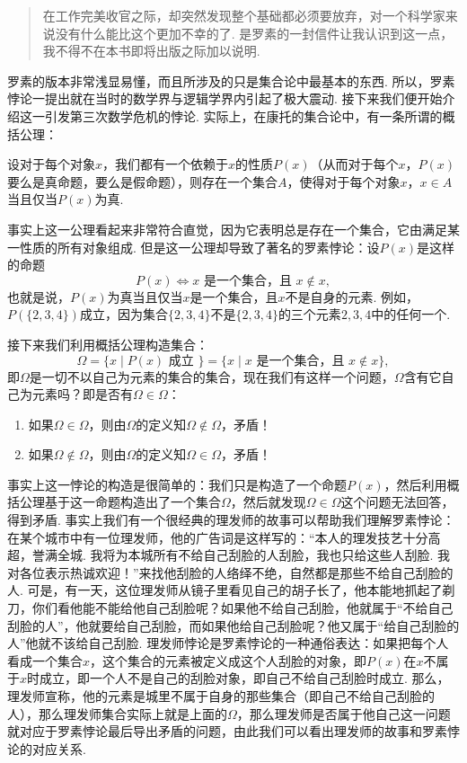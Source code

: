 \begin{quote}
    \kaishu
    在工作完美收官之际，却突然发现整个基础都必须要放弃，对一个科学家来说没有什么能比这个更加不幸的了. 是罗素的一封信件让我认识到这一点，我不得不在本书即将出版之际加以说明.
\end{quote}

罗素的版本非常浅显易懂，而且所涉及的只是集合论中最基本的东西. 所以，罗素悖论一提出就在当时的数学界与逻辑学界内引起了极大震动. 接下来我们便开始介绍这一引发第三次数学危机的悖论. 实际上，在康托的集合论中，有一条所谓的概括公理：

\begin{axiom}%
    设对于每个对象$x$，我们都有一个依赖于$x$的性质$P(x)$（从而对于每个$x$，$P(x)$要么是真命题，要么是假命题），则存在一个集合$A$，使得对于每个对象$x$，$x\in A$当且仅当$P(x)$为真.
\end{axiom}

事实上这一公理看起来非常符合直觉，因为它表明总是存在一个集合，它由满足某一性质的所有对象组成. 但是这一公理却导致了著名的罗素悖论：设$P(x)$是这样的命题
\[P(x)\iff x\text{~是一个集合，且~}x\notin x,\]
也就是说，$P(x)$为真当且仅当$x$是一个集合，且$x$不是自身的元素. 例如，$P(\{2,3,4\})$成立，因为集合$\{2,3,4\}$不是$\{2,3,4\}$的三个元素$2,3,4$中的任何一个.

接下来我们利用概括公理构造集合：
\[\Omega=\{x\mid P(x)\text{~成立~}\}=\{x\mid x\text{~是一个集合，且~}x\notin x\},\]
即$\Omega$是一切不以自己为元素的集合的集合，现在我们有这样一个问题，$\Omega$含有它自己为元素吗？即是否有$\Omega\in\Omega$：
\begin{enumerate}
    \item 如果$\Omega\in \Omega$，则由$\Omega$的定义知$\Omega\notin \Omega$，矛盾！

    \item 如果$\Omega\notin \Omega$，则由$\Omega$的定义知$\Omega\in \Omega$，矛盾！
\end{enumerate}

事实上这一悖论的构造是很简单的：我们只是构造了一个命题$P(x)$，然后利用概括公理基于这一命题构造出了一个集合$\Omega$，然后就发现$\Omega\in\Omega$这个问题无法回答，得到矛盾. 事实上我们有一个很经典的理发师的故事可以帮助我们理解罗素悖论：在某个城市中有一位理发师，他的广告词是这样写的：``本人的理发技艺十分高超，誉满全城. 我将为本城所有不给自己刮脸的人刮脸，我也只给这些人刮脸. 我对各位表示热诚欢迎！''来找他刮脸的人络绎不绝，自然都是那些不给自己刮脸的人. 可是，有一天，这位理发师从镜子里看见自己的胡子长了，他本能地抓起了剃刀，你们看他能不能给他自己刮脸呢？如果他不给自己刮脸，他就属于``不给自己刮脸的人''，他就要给自己刮脸，而如果他给自己刮脸呢？他又属于``给自己刮脸的人''他就不该给自己刮脸. 理发师悖论是罗素悖论的一种通俗表达：如果把每个人看成一个集合$x$，这个集合的元素被定义成这个人刮脸的对象，即$P(x)$在$x$不属于$x$时成立，即一个人不是自己的刮脸对象，即自己不给自己刮脸时成立. 那么，理发师宣称，他的元素是城里不属于自身的那些集合（即自己不给自己刮脸的人），那么理发师集合实际上就是上面的$\Omega$，那么理发师是否属于他自己这一问题就对应于罗素悖论最后导出矛盾的问题，由此我们可以看出理发师的故事和罗素悖论的对应关系.

